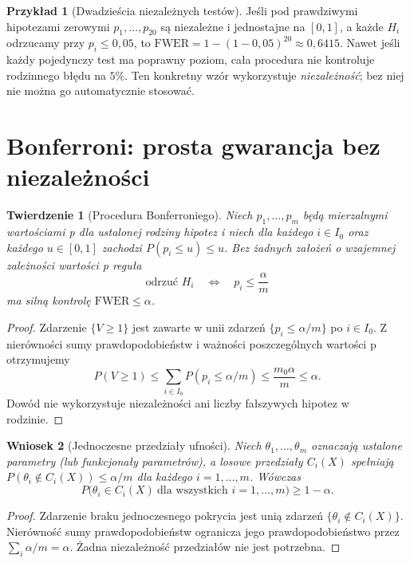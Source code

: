 \documentclass[11pt,a4paper,oneside]{report}
\numberwithin{equation}{chapter}
\theoremstyle{plain}
\newtheorem{twierdzenie}{Twierdzenie}[chapter]
\newtheorem{wniosek}[twierdzenie]{Wniosek}
\theoremstyle{definition}
\newtheorem{przyklad}{Przykład}[chapter]
\theoremstyle{remark}
\begin{document}
\begin{przyklad}[Dwadzieścia niezależnych testów]
Jeśli pod prawdziwymi hipotezami zerowymi
$p_1,\ldots,p_{20}$ są niezależne i jednostajne na
$[0,1]$, a każde $H_i$ odrzucamy przy $p_i\le0{,}05$,
to $\mathrm{FWER}=1-(1-0{,}05)^{20}\approx0{,}6415$.
Nawet jeśli każdy pojedynczy test ma poprawny poziom,
cała procedura nie kontroluje rodzinnego błędu na $5\%$.
Ten konkretny wzór wykorzystuje \emph{niezależność}; bez
niej nie można go automatycznie stosować.
\end{przyklad}

\section{Bonferroni: prosta gwarancja bez niezależności}
\begin{twierdzenie}[Procedura Bonferroniego]\label{thm:bonferroni}
Niech $p_1,\ldots,p_m$ będą mierzalnymi wartościami p
dla ustalonej rodziny hipotez i niech dla każdego
$i\in I_0$ oraz każdego $u\in[0,1]$ zachodzi
$P(p_i\le u)\le u$. Bez żadnych założeń o wzajemnej
zależności wartości p reguła
\[
 \text{odrzuć }H_i\quad\Longleftrightarrow\quad
 p_i\le\frac\alpha m
\]
ma silną kontrolę $\mathrm{FWER}\le\alpha$.
\end{twierdzenie}
\begin{proof}
Zdarzenie $\{V\ge1\}$ jest zawarte w unii zdarzeń
$\{p_i\le\alpha/m\}$ po $i\in I_0$.
Z nierówności sumy prawdopodobieństw i ważności
poszczególnych wartości p otrzymujemy
\[
 P(V\ge1)\le\sum_{i\in I_0}P(p_i\le\alpha/m)
 \le\frac{m_0\alpha}m\le\alpha.
\]
Dowód nie wykorzystuje niezależności ani liczby fałszywych
hipotez w rodzinie.
\end{proof}

\begin{wniosek}[Jednoczesne przedziały ufności]
\label{cor:simultaneous-ci}
Niech $\theta_1,\ldots,\theta_m$ oznaczają ustalone
parametry (lub funkcjonały parametrów), a losowe
przedziały $C_i(X)$ spełniają
$P(\theta_i\notin C_i(X))\le\alpha/m$ dla każdego
$i=1,\ldots,m$. Wówczas
\[
 P\bigl(\theta_i\in C_i(X)\ \text{dla wszystkich }
 i=1,\ldots,m\bigr)\ge1-\alpha.
\]
\end{wniosek}
\begin{proof}
Zdarzenie braku jednoczesnego pokrycia jest unią zdarzeń
$\{\theta_i\notin C_i(X)\}$. Nierówność sumy
prawdopodobieństw ogranicza jego prawdopodobieństwo przez
$\sum_i\alpha/m=\alpha$. Żadna niezależność przedziałów
nie jest potrzebna.
\end{proof}
\end{document}
